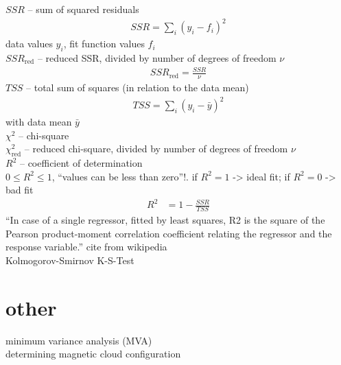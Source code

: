 $SSR$ -- sum of squared residuals\\
\begin{align}
	SSR = \sum_i (y_i - f_i)^2
\end{align}
data values $y_i$, fit function values $f_i$\\
$SSR_\text{red}$ -- reduced SSR, divided by number of degrees of freedom $\nu$\\
\begin{align}
	SSR_\text{red} = \frac{SSR}{\nu}
\end{align}
$TSS$ -- total sum of squares (in relation to the data mean)\\
\begin{align}
	TSS = \sum_i (y_i - \bar{y})^2
\end{align}
with data mean $\bar{y}$\\

$\chi^2$ -- chi-square\\
$\chi^2_\text{red}$ -- reduced chi-square, divided by number of degrees of freedom $\nu$\\

$R^2$ -- coefficient of determination\\
$0 \leq R^2 \leq 1$, ``values can be less than zero''!. if $R^2 = 1$ -> ideal fit; if $R^2 = 0$ -> bad fit
\begin{align}
	R^2 &= 1 - \frac{SSR}{TSS}
\end{align}
``In case of a single regressor, fitted by least squares, R2 is the square of the Pearson product-moment correlation coefficient relating the regressor and the response variable.'' cite from wikipedia \\%

Kolmogorov-Smirnov K-S-Test


\section{other}

minimum variance analysis (MVA)\\
determining magnetic cloud configuration \citep{Bothmer1998}\\

